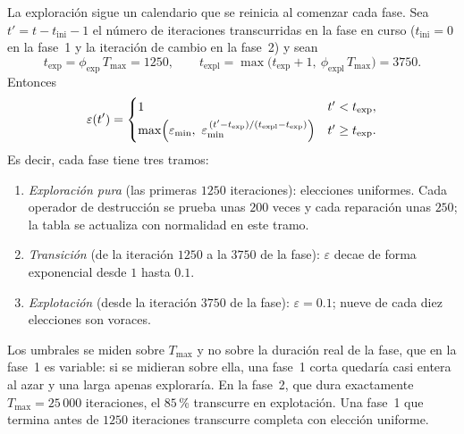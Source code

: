 La exploración sigue un calendario que se reinicia al comenzar cada fase. Sea
$t'=t-t_{\mathrm{ini}}-1$ el número de iteraciones transcurridas en la fase en curso
($t_{\mathrm{ini}}=0$ en la fase~1 y la iteración de cambio en la fase~2) y sean
\[
t_{\mathrm{exp}}=\phi_{\mathrm{exp}}\,T_{\max}=1250,\qquad
t_{\mathrm{expl}}=\max\bigl(t_{\mathrm{exp}}+1,\ \phi_{\mathrm{expl}}\,T_{\max}\bigr)=3750 .
\]
Entonces
\begin{equation}
\varepsilon(t')=
\begin{cases}
1 & t'<t_{\mathrm{exp}},\\[3pt]
\max\Bigl(\varepsilon_{\min},\ \varepsilon_{\min}^{\,(t'-t_{\mathrm{exp}})/(t_{\mathrm{expl}}-t_{\mathrm{exp}})}\Bigr) & t'\ge t_{\mathrm{exp}}.
\end{cases}
\label{eq:eps}
\end{equation}
Es decir, cada fase tiene tres tramos:
\begin{enumerate}
\item \emph{Exploración pura} (las primeras $1250$ iteraciones): elecciones uniformes. Cada
operador de destrucción se prueba unas $200$ veces y cada reparación unas $250$; la tabla se
actualiza con normalidad en este tramo.
\item \emph{Transición} (de la iteración $1250$ a la $3750$ de la fase): $\varepsilon$ decae
de forma exponencial desde $1$ hasta $0.1$.
\item \emph{Explotación} (desde la iteración $3750$ de la fase): $\varepsilon=0.1$; nueve de
cada diez elecciones son voraces.
\end{enumerate}
Los umbrales se miden sobre $T_{\max}$ y no sobre la duración real de la fase, que en la
fase~1 es variable: si se midieran sobre ella, una fase~1 corta quedaría casi entera al azar
y una larga apenas exploraría. En la fase~2, que dura exactamente $T_{\max}=25\,000$
iteraciones, el $85$\,\% transcurre en explotación. Una fase~1 que termina antes de $1250$
iteraciones transcurre completa con elección uniforme.

\begin{algorithm}[H]
\caption{Selección $\varepsilon$-voraz ( y )}
\label{alg:ql-sel}
\end{algorithm}

